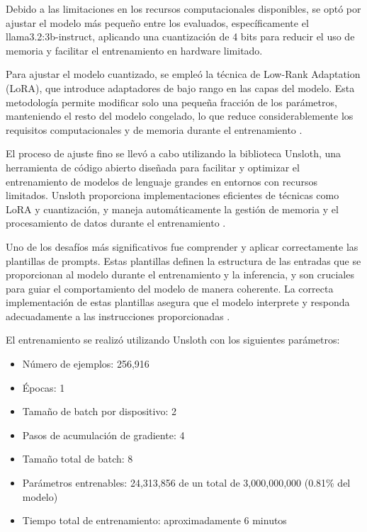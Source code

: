 \documentclass[../main.tex]{subfiles}
\begin{document}
Debido a las limitaciones en los recursos computacionales disponibles, se optó por ajustar el modelo más pequeño entre los evaluados, específicamente el llama3.2:3b-instruct, aplicando una cuantización de 4 bits para reducir el uso de memoria y facilitar el entrenamiento en hardware limitado.

Para ajustar el modelo cuantizado, se empleó la técnica de Low-Rank Adaptation (LoRA), que introduce adaptadores de bajo rango en las capas del modelo. Esta metodología permite modificar solo una pequeña fracción de los parámetros, manteniendo el resto del modelo congelado, lo que reduce considerablemente los requisitos computacionales y de memoria durante el entrenamiento \parencite{hu2021lora}.

El proceso de ajuste fino se llevó a cabo utilizando la biblioteca Unsloth, una herramienta de código abierto diseñada para facilitar y optimizar el entrenamiento de modelos de lenguaje grandes en entornos con recursos limitados. Unsloth proporciona implementaciones eficientes de técnicas como LoRA y cuantización, y maneja automáticamente la gestión de memoria y el procesamiento de datos durante el entrenamiento \parencite{unsloth_docs}.

Uno de los desafíos más significativos fue comprender y aplicar correctamente las plantillas de prompts. Estas plantillas definen la estructura de las entradas que se proporcionan al modelo durante el entrenamiento y la inferencia, y son cruciales para guiar el comportamiento del modelo de manera coherente. La correcta implementación de estas plantillas asegura que el modelo interprete y responda adecuadamente a las instrucciones proporcionadas \parencite{huggingface_templates}.

El entrenamiento se realizó utilizando Unsloth con los siguientes parámetros:

\begin{itemize}
	\item Número de ejemplos: 256,916
	\item Épocas: 1
	\item Tamaño de batch por dispositivo: 2
	\item Pasos de acumulación de gradiente: 4
	\item Tamaño total de batch: 8
	\item Parámetros entrenables: 24,313,856 de un total de 3,000,000,000 (0.81\% del modelo)
	\item Tiempo total de entrenamiento: aproximadamente 6 minutos
\end{itemize}
\end{document}
